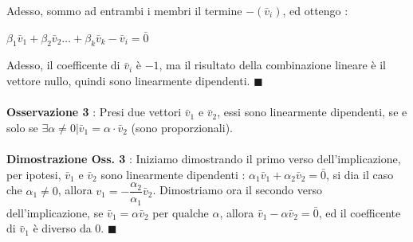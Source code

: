 \documentclass[12pt, letterpaper]{article}
\newcommand{\acc}{\\\hphantom{}\\}
\begin{document}
 Adesso, sommo ad entrambi i membri il termine \(-(\bar v_i)\), ed ottengo : \begin{center}
    \( \beta_1\bar v_1+\beta_2\bar v_2\dots+\beta_k\bar v_k - \bar v_i = \bar 0\)
 \end{center}
 Adesso, il coefficente di \(\bar v_i\) è \(-1\), ma il risultato della combinazione lineare è il 
 vettore nullo, quindi sono linearmente dipendenti. \(\blacksquare\)\acc 
 \textbf{Osservazione 3} : Presi due vettori \(\bar v_1\) e \(\bar v_2\), essi sono linearmente dipendenti, 
 se e solo se \(\exists \alpha \ne 0 |\bar v_1 = \alpha\cdot \bar v_2\) (sono proporzionali).\acc 
 \textbf{Dimostrazione Oss. 3} :  Iniziamo dimostrando il primo verso dell'implicazione, per ipotesi, 
 \(\bar v_1\) e \(\bar v_2\) sono linearmente dipendenti : \(\alpha_1\bar v_1+\alpha_2\bar v_2=\bar 0\), si dia 
 il caso che \(\alpha_1\ne 0\), allora \(v_1 = -\dfrac{\alpha_2}{\alpha_1}\bar v_2\). Dimostriamo ora il 
 secondo verso dell'implicazione, se \(\bar v_1 = \alpha \bar v_2\) per qualche \(\alpha\), allora 
 \(\bar v_1-\alpha \bar v_2=\bar 0\), ed il coefficente di \(\bar v_1\) è diverso da 0. \(\blacksquare\)
\end{document}
